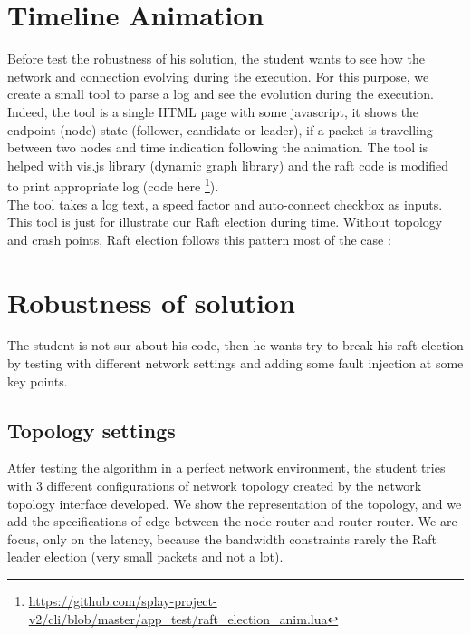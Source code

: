 \documentclass{eplmastersthesis}
\begin{document}
      \section{Timeline Animation} %

        Before test the robustness of his solution, the student wants to see how the network and connection evolving during the execution.
        For this purpose, we create a small tool to parse a log and see the evolution during the execution.
        Indeed, the tool is a single HTML page with some javascript, it shows the endpoint (node) state
        (follower, candidate or leader), if a packet is travelling between two nodes and time indication
        following the animation. The tool is helped with vis.js library \cite{VisJS} (dynamic graph library)
        and the raft code is modified to print appropriate log
        (code here \footnote{\url{https://github.com/splay-project-v2/cli/blob/master/app_test/raft_election_anim.lua}}).\\

        The tool takes a log text, a speed factor and auto-connect checkbox as inputs. This tool is just for
        illustrate our Raft election during time. Without topology and crash points, Raft election follows this pattern
        most of the case :


      \section{Robustness of solution} %

        The student is not sur about his code, then he wants try to break his raft election by testing
        with different network settings and adding some fault injection at some key points.

        \subsection{Topology settings} %

          Atfer testing the algorithm in a perfect network environment, the student tries with 3 different configurations
          of network topology created by the network topology interface developed. We show the representation of
          the topology, and we add the specifications of edge between the node-router and router-router. We are focus,
          only on the latency, because the bandwidth constraints rarely the Raft leader election (very small packets and not a lot).
\end{document}
